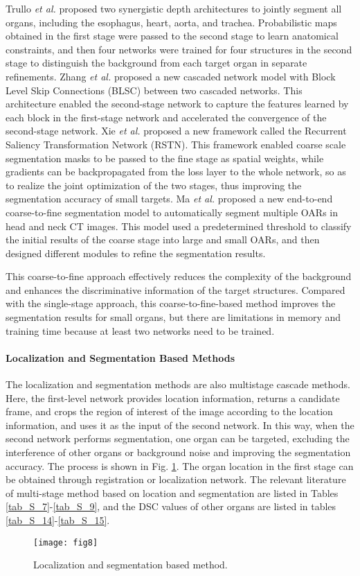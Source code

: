 \documentclass[lettersize,journal]{IEEEtran}
\begin{document}
Trullo {\it{et al.}} \cite{83} proposed two synergistic depth architectures to jointly segment all organs, including the esophagus, heart, aorta, and trachea. Probabilistic maps obtained in the first stage were passed to the second stage to learn anatomical constraints, and then four networks were trained for four structures in the second stage to distinguish the background from each target organ in separate refinements. Zhang {\it{et al.}} \cite{129} proposed a new cascaded network model with Block Level Skip Connections (BLSC) between two cascaded networks. This architecture enabled the second-stage network to capture the features learned by each block in the first-stage network and accelerated the convergence of the second-stage network. Xie {\it{et al.}} \cite{130} proposed a new framework called the Recurrent Saliency Transformation Network (RSTN). This framework enabled coarse scale segmentation masks to be passed to the fine stage as spatial weights, while gradients can be backpropagated from the loss layer to the whole network, so as to realize the joint optimization of the two stages, thus improving the segmentation accuracy of small targets. Ma {\it{et al.}} \cite{125} proposed a new end-to-end coarse-to-fine segmentation model to automatically segment multiple OARs in head and neck CT images. This model used a predetermined threshold to classify the initial results of the coarse stage into large and small OARs, and then designed different modules to refine the segmentation results.

This coarse-to-fine approach effectively reduces the complexity of the background and enhances the discriminative information of the target structures. Compared with the single-stage approach, this coarse-to-fine-based method improves the segmentation results for small organs, but there are limitations in memory and training time because at least two networks need to be trained.

\paragraph{Localization and Segmentation Based Methods}
The localization and segmentation methods are also multistage cascade methods. Here, the first-level network provides location information, returns a candidate frame, and crops the region of interest of the image according to the location information, and uses it as the input of the second network. In this way, when the second network performs segmentation, one organ can be targeted, excluding the interference of other organs or background noise and improving the segmentation accuracy. The process is shown in Fig. \ref{fig8}. The organ location in the first stage can be obtained through registration or localization network. The relevant literature of multi-stage method based on location and segmentation are listed in Tables \ref{tab_S_7}-\ref{tab_S_9}, and the DSC values of other organs are listed in tables \ref{tab_S_14}-\ref{tab_S_15}.
\begin{figure}[ht!]
    \centering
    \texttt{[image: fig8]}
    \caption{Localization and segmentation based method.}
    \label{fig8}
\end{figure}
\end{document}
